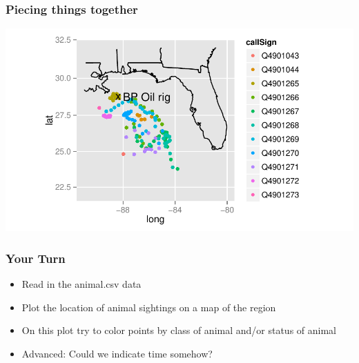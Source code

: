\documentclass{beamer}\usepackage[]{graphicx}\usepackage[]{color}
\newenvironment{knitrout}{}{} %
\begin{document}
\begin{frame}[fragile]
\frametitle{Piecing things together}

\begin{knitrout}\footnotesize
{}\color{fgcolor}

{\centering \includegraphics[width=\linewidth]{figure/endmap2} 

}



\end{knitrout}
\end{frame}



\begin{frame}
\frametitle{Your Turn}
\begin{itemize}
  \item Read in the animal.csv data 
\bigskip
  \item Plot the location of animal sightings on a map of the region
  \item On this plot try to color points by class of animal and/or status of animal
\bigskip
  \item Advanced: Could we indicate time somehow?
\end{itemize}
\end{frame}
\end{document}
